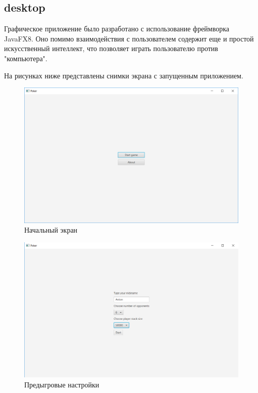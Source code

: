 \subsection*{desktop}

Графическое приложение было разработано с использование фреймворка JavaFX8. Оно помимо взаимодействия с пользователем содержит еще и простой искусственный интеллект, что позволяет играть пользователю против "компьютера".

На рисунках ниже представлены снимки экрана с запущенным приложением.

\begin{figure}[H]
	\begin{center}
		\includegraphics[scale=0.5]{pics/1.png}
	    \caption{Начальный экран} 
		\label{pic:gui:1}
	\end{center}
\end{figure}

\begin{figure}[H]
	\begin{center}
		\includegraphics[scale=0.5]{pics/2.png}
	    \caption{Предыгровые настройки} 
		\label{pic:gui:2}
	\end{center}
\end{figure}

